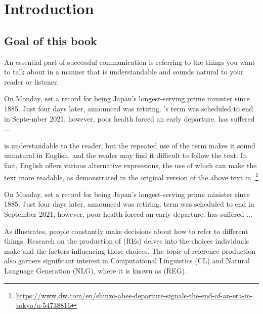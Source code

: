 \chapter{Introduction}\label{chap1}

\section{Goal of this book}


An essential part of successful communication is referring to the things you want to talk about in a manner that is understandable and sounds natural to your reader or listener.

\begin{exe}
	\ex\label{ex:weird_abe} On Monday,  set a record for being Japan's longest-serving prime minister since 1885. Just four days later,  announced   was retiring. 's term was scheduled to end in Septe-mber 2021, however, poor health forced an early departure.  has suffered ...
\end{exe}

 is understandable to the reader, but the repeated use of the term  makes it sound unnatural in English, and the reader may find it difficult to follow the text.
In fact, English offers various alternative expressions, the use of which can make the text more readable, as demonstrated in the original version of the above text in .\footnote{\url{https://www.dw.com/en/shinzo-abes-departure-signals-the-end-of-an-era-in-tokyo/a-54738816}}

\begin{exe}
	\ex\label{ex:abe} On Monday,  set a record for being Japan's longest-serving prime minister since 1885. Just four days later,  announced  was retiring.  term was scheduled to end in September 2021, however, poor health forced an early departure.  has suffered ...
\end{exe}

As  illustrates, people constantly make decisions about how to refer to different things. Research on the production of  (REs) delves into the choices individuals make and the factors influencing those choices. The topic of reference production also garners significant interest in Computational Linguistics (CL) and Natural Language Generation (NLG), where it is known as  (REG).

